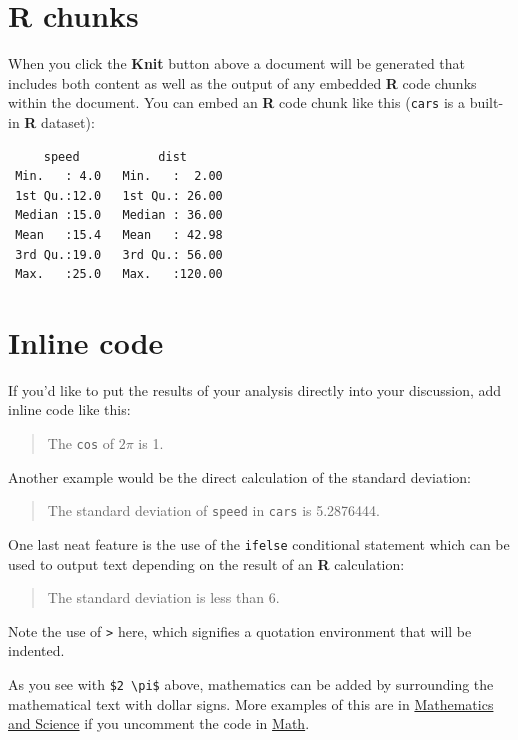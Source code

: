 \documentclass[12pt,twoside]{Mactemplate}
\theoremstyle{definition}
\theoremstyle{definition}
\theoremstyle{definition}
\theoremstyle{remark}
\begin{document}
\section{R chunks}\label{r-chunks}

When you click the \textbf{Knit} button above a document will be
generated that includes both content as well as the output of any
embedded \textbf{R} code chunks within the document. You can embed an
\textbf{R} code chunk like this (\texttt{cars} is a built-in \textbf{R}
dataset):
\begin{Shaded}
\begin{Highlighting}[]
\end{Highlighting}
\end{Shaded}
\begin{verbatim}
     speed           dist       
 Min.   : 4.0   Min.   :  2.00  
 1st Qu.:12.0   1st Qu.: 26.00  
 Median :15.0   Median : 36.00  
 Mean   :15.4   Mean   : 42.98  
 3rd Qu.:19.0   3rd Qu.: 56.00  
 Max.   :25.0   Max.   :120.00  
\end{verbatim}
\section{Inline code}\label{inline-code}

If you'd like to put the results of your analysis directly into your
discussion, add inline code like this:
\begin{quote}
The \texttt{cos} of \(2 \pi\) is 1.
\end{quote}
Another example would be the direct calculation of the standard
deviation:
\begin{quote}
The standard deviation of \texttt{speed} in \texttt{cars} is 5.2876444.
\end{quote}
One last neat feature is the use of the \texttt{ifelse} conditional
statement which can be used to output text depending on the result of an
\textbf{R} calculation:
\begin{quote}
The standard deviation is less than 6.
\end{quote}
Note the use of \texttt{\textgreater{}} here, which signifies a
quotation environment that will be indented.

As you see with \texttt{\$2\ \textbackslash{}pi\$} above, mathematics
can be added by surrounding the mathematical text with dollar signs.
More examples of this are in \protect\hyperlink{math-sci}{Mathematics
and Science} if you uncomment the code in
\protect\hyperlink{math}{Math}.
\end{document}

